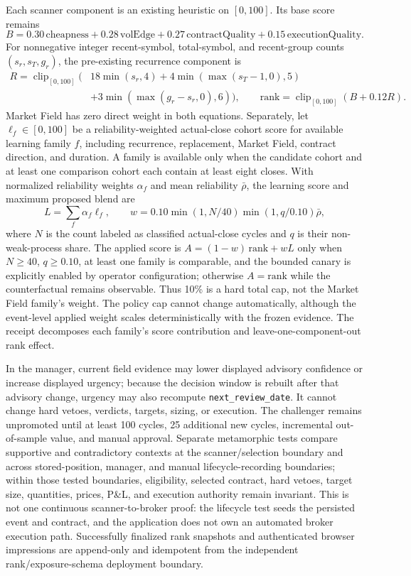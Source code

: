 \documentclass{article}
\newcommand{\method}{Market Field}
\newcommand{\clip}{\operatorname{clip}}
\begin{document}
Each scanner component is an existing heuristic on $[0,100]$. Its base score remains
\begin{equation}
B=0.30\,\mathrm{cheapness}+0.28\,\mathrm{volEdge}
+0.27\,\mathrm{contractQuality}+0.15\,\mathrm{executionQuality}.
\end{equation}
For nonnegative integer recent-symbol, total-symbol, and recent-group counts $(s_r,s_T,g_r)$, the pre-existing recurrence component is
\begin{align}
R=\clip_{[0,100]}(&18\min(s_r,4)+4\min(\max(s_T-1,0),5)\nonumber\\
&+3\min(\max(g_r-s_r,0),6)),\qquad
\mathrm{rank}=\clip_{[0,100]}(B+0.12R).
\end{align}
\method{} has zero direct weight in both equations. Separately, let $\ell_f\in[0,100]$ be a reliability-weighted actual-close cohort score for available learning family $f$, including recurrence, replacement, Market Field, contract direction, and duration. A family is available only when the candidate cohort and at least one comparison cohort each contain at least eight closes. With normalized reliability weights $\alpha_f$ and mean reliability $\bar\rho$, the learning score and maximum proposed blend are
\begin{equation}
L=\sum_f\alpha_f\ell_f,\qquad
w=0.10\min(1,N/40)\min(1,q/0.10)\bar\rho,
\end{equation}
where $N$ is the count labeled as classified actual-close cycles and $q$ is their non-weak-process share. The applied score is $A=(1-w)\,\mathrm{rank}+wL$ only when $N\ge40$, $q\ge0.10$, at least one family is comparable, and the bounded canary is explicitly enabled by operator configuration; otherwise $A=\mathrm{rank}$ while the counterfactual remains observable. Thus 10\% is a hard total cap, not the Market Field family's weight. The policy cap cannot change automatically, although the event-level applied weight scales deterministically with the frozen evidence. The receipt decomposes each family's score contribution and leave-one-component-out rank effect.

In the manager, current field evidence may lower displayed advisory confidence or increase displayed urgency; because the decision window is rebuilt after that advisory change, urgency may also recompute \texttt{next\_review\_date}. It cannot change hard vetoes, verdicts, targets, sizing, or execution. The challenger remains unpromoted until at least 100 cycles, 25 additional new cycles, incremental out-of-sample value, and manual approval. Separate metamorphic tests compare supportive and contradictory contexts at the scanner/selection boundary and across stored-position, manager, and manual lifecycle-recording boundaries; within those tested boundaries, eligibility, selected contract, hard vetoes, target size, quantities, prices, P\&L, and execution authority remain invariant. This is not one continuous scanner-to-broker proof: the lifecycle test seeds the persisted event and contract, and the application does not own an automated broker execution path. Successfully finalized rank snapshots and authenticated browser impressions are append-only and idempotent from the independent rank/exposure-schema deployment boundary.
\end{document}
